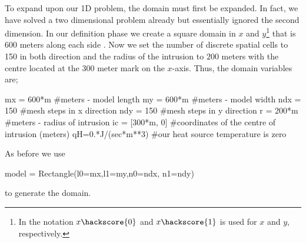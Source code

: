To expand upon our 1D problem, the domain must first be expanded. In fact, we
have solved a two dimensional problem already but essentially ignored the second
dimension. In our definition phase we create a square domain in $x$ and
$y$\footnote{In \esc the notation
$x\hackscore{0}$ and $x\hackscore{1}$ is used for $x$ and $y$, respectively.}
that is $600$ meters along each side . Now we set the
number of discrete spatial cells to 150 in both direction and the radius of the
intrusion to $200$ meters with the centre located at the $300$ meter mark on the
$x$-axis. Thus, the domain variables are;
\begin{python}
mx = 600*m #meters - model length
my = 600*m #meters - model width
ndx = 150 #mesh steps in x direction 
ndy = 150 #mesh steps in y direction
r = 200*m #meters - radius of intrusion
ic = [300*m, 0] #coordinates of the centre of intrusion (meters)
qH=0.*J/(sec*m**3) #our heat source temperature is zero
\end{python}
As before we use 
\begin{python}
model = Rectangle(l0=mx,l1=my,n0=ndx, n1=ndy)
\end{python}
to generate the domain. 

